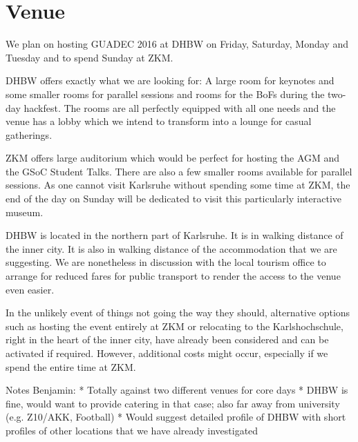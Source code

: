
\section{Venue}


We plan on hosting GUADEC 2016 at DHBW on Friday, Saturday, Monday and Tuesday and to spend Sunday at ZKM.

DHBW offers exactly what we are looking for: A large room for keynotes and some smaller rooms for parallel sessions and rooms for the BoFs during the two-day hackfest. The rooms are all perfectly equipped with all one needs and the venue has a lobby which we intend to transform into a lounge for casual gatherings. 

ZKM offers large auditorium which would be perfect for hosting the AGM and the GSoC Student Talks. There are also a few smaller rooms available for parallel sessions. As one cannot visit Karlsruhe without spending some time at ZKM, the end of the day on Sunday will be dedicated to visit this particularly interactive museum.

DHBW is located in the northern part of Karlsruhe. It is in walking distance of the inner city. It is also in walking distance of the accommodation that we are suggesting. We are nonetheless in discussion with the local tourism office to arrange for reduced fares for public transport to render the access to the venue even easier. 

In the unlikely event of things not going the way they should, alternative options such as hosting the event entirely at ZKM or relocating to the Karlshochschule, right in the heart of the inner city, have already been considered and can be activated if required. However, additional costs might occur, especially if we spend the entire time at ZKM. 

Notes Benjamin:
 * Totally against two different venues for core days
 * DHBW is fine, would want to provide catering in that case; also far away from university (e.g. Z10/AKK, Football)
 * Would suggest detailed profile of DHBW with short profiles of other locations that we have already investigated

